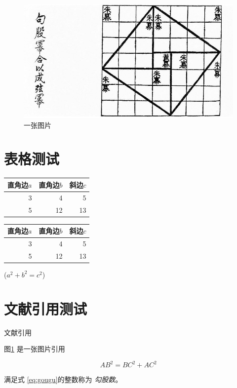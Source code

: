 \documentclass[UTF8]{ctexart}
\begin{document}
\begin{figure}[ht]
  \centering
  \includegraphics[scale=0.5]{1.jpg}
  \caption{一张图片}
  \label{flag:xiantu}
\end{figure}


\section{表格测试}

\begin{tabular}{|rrr|}
\hline
    直角边$a$ & 直角边$b$ & 斜边$c$ \\
\hline
    3 &  4 &  5 \\
    5 &  12 & 13 \\
\hline
\end{tabular}

\begin{table}[H]
  \begin{tabular}{|rrr|}
    \hline
        直角边$a$ & 直角边$b$ & 斜边$c$ \\
    \hline
        3 &  4 &  5 \\
        5 &  12 & 13 \\
    \hline
  \end{tabular}
  \qquad ($a^2 + b^2 = c^2$)
\end{table}

\section{文献引用测试}
文献引用 \cite{Kline}

图\ref{flag:xiantu} 是一张图片引用

\begin{equation}\label{eq:gougu}
  AB^2 = BC^2 + AC^2
\end{equation}

满足式 \eqref{eq:gougu}的整数称为 \emph{勾股数}。

\nocite{Shiye}

\end{document}
